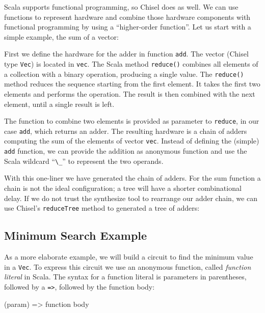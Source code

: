 \documentclass[%
    10pt,
    headinclude, footexclude,
    openright, %
    notitlepage,
    cleardoubleempty,
    headsepline,
    pointlessnumbers,
    bibtotoc, idxtotoc,
    ]{scrbook}
\newcommand{\code}[1]{{\lstinline[basicstyle=\small\ttfamily]{#1}}}
\begin{document}

Scala supports functional programming, so Chisel does as well.
We can use functions to represent hardware and combine those hardware components
with functional programming by using a ``higher-order function''.
Let us start with a simple example, the sum of a vector:


First we define the hardware for the adder in function \code{add}.
The vector (Chisel type \code{Vec}) is located in \code{vec}. The Scala method \code{reduce()} combines
all elements of a collection with a binary operation, producing a single value.
The \code{reduce()} method reduces the sequence starting from the first element.
It takes the first two elements and performs the operation. The result is then combined
with the next element, until a single result is left.

The function to combine two elements is provided as parameter to \code{reduce}, in our case \code{add},
which returns an adder. The resulting hardware is a chain of adders computing
the sum of the elements of vector \code{vec}.
Instead of defining the (simple) \code{add} function, we can provide the addition
as anonymous function and use the Scala wildcard ``\code{\_}'' to represent the
two operands.


\noindent With this one-liner we have generated the chain of adders. For the sum function
a chain is not the ideal configuration; a tree will have a shorter combinational delay.
If we do not trust the synthesize tool to rearrange our adder chain, we can use Chisel's
\code{reduceTree} method to generated a tree of adders:


\subsection{Minimum Search Example}

As a more elaborate example, we will build a circuit to find the minimum value in a \code{Vec}. To express this circuit
we use an anonymous function, called \emph{function literal} in Scala.  The syntax for a function
literal is parameters in parentheses, followed by a \code{=>}, followed by the function body:

\begin{chisel}
  (param) => function body
\end{chisel}
\end{document}
